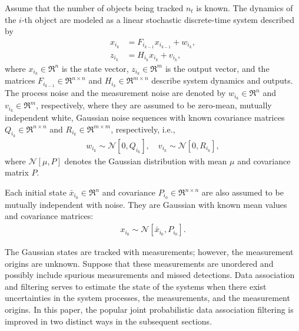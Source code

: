 Assume that the number of objects being tracked $n_t$ is known.
The dynamics of the $i$-th object are modeled as a linear stochastic discrete-time system described by
\begin{align}
x_{i_{k}} & = F_{i_{k-1}} x_{i_{k-1}} + w_{i_{k}},\label{eqn:xkp}\\
z_{i_k} & = H_{i_k} x_{i_k} + v_{i_k},\label{eqn:zlin}
\end{align}
where $x_{i_k}\in\Re^n$ is the state vector, $z_{i_k}\in\Re^m$ is the output vector, and  the matrices $F_{i_{k-1}}\in\Re^{n\times n}$ and $H_{i_k}\in\Re^{m\times n}$ describe system dynamics and outputs.
The process noise and the measurement noise are denoted by $w_{i_k}\in\Re^n$ and $v_{i_k}\in\Re^m$, respectively, where they are assumed to be zero-mean, mutually independent white, Gaussian noise sequences with known covariance matrices $Q_{i_k}\in\Re^{n\times n}$ and $R_{i_k}\in\Re^{m\times m}$, respectively, i.e.,
\begin{align}
w_{i_k} \sim \mathcal{N}[0,Q_{i_k}],\quad
v_{i_k} \sim \mathcal{N}[0,R_{i_k}],
\end{align}
where $\mathcal{N}[\mu,P]$ denotes the Gaussian distribution with mean $\mu$ and covariance matrix $P$.

Each initial state $\bar x_{i_0}\in\Re^n$ and covariance $P_{i_0}\in\Re^{n\times n}$ are also assumed to be mutually independent with noise. They are Gaussian with known mean values and covariance matrices:
\begin{align}
x_{i_0} \sim \mathcal{N}[\bar x_{i_0}, P_{i_0}].\label{eqn:xi0}
\end{align}

The Gaussian states are tracked with measurements; however, the measurement origins are unknown. Suppose that these measurements are unordered and possibly include spurious measurements and missed detections. Data association and filtering serves to estimate the state of the systems when there exist uncertainties in the system processes, the measurements, and the measurement origins. In this paper, the popular joint probabilistic data association filtering is improved in two distinct ways in the subsequent sections.


